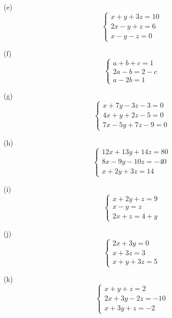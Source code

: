 \documentclass[12pt]{article}
\begin{document}
\begin{exercici}
(e) 
\[
\begin{cases}
x + y + 3z = 10 \\
2x - y + z = 6 \\
x - y - z = 0
\end{cases}
\]
\end{exercici}

\begin{exercici}
(f) 
\[
\begin{cases}
a + b + c = 1 \\
2a - b = 2 - c \\
a - 2b = 1
\end{cases}
\]
\end{exercici}

\begin{exercici}
(g) 
\[
\begin{cases}
x + 7y - 3z - 3 = 0 \\
4x + y + 2z - 5 = 0 \\
7x - 5y + 7z - 9 = 0
\end{cases}
\]
\end{exercici}

\begin{exercici}
(h) 
\[
\begin{cases}
12x + 13y + 14z = 80 \\
8x - 9y - 10z = -40 \\
x + 2y + 3z = 14
\end{cases}
\]
\end{exercici}

\begin{exercici}
(i) 
\[
\begin{cases}
x + 2y + z = 9 \\
x - y = z \\
2x + z = 4 + y
\end{cases}
\]
\end{exercici}

\begin{exercici}
(j) 
\[
\begin{cases}
2x + 3y = 0 \\
x + 3z = 3 \\
x + y + 3z = 5
\end{cases}
\]
\end{exercici}

\begin{exercici}
(k) 
\[
\begin{cases}
x + y + z = 2 \\
2x + 3y - 2z = -10 \\
x + 3y + z = -2
\end{cases}
\]
\end{exercici}
\end{document}
